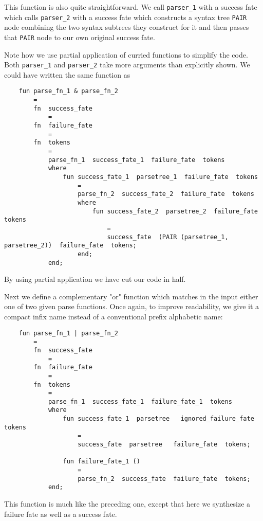 This function is also quite straightforward.  We call 
{\tt parser\_1} with a success fate 
which calls {\tt parser\_2} 
with a success fate which constructs a syntax tree 
{\tt PAIR} node combining the two syntax subtrees they 
construct for it and then passes that {\tt PAIR} 
node to our own original success fate.

Note how we use partial application of curried functions 
to simplify the code.  Both {\tt parser\_1} and {\tt parser\_2} 
take more arguments than explicitly shown.  We could have 
written the same function as

\begin{verbatim}
    fun parse_fn_1 & parse_fn_2
        =
        fn  success_fate
            =
        fn  failure_fate
            =
        fn  tokens
            =
            parse_fn_1  success_fate_1  failure_fate  tokens
            where
                fun success_fate_1  parsetree_1  failure_fate  tokens
                    =
                    parse_fn_2  success_fate_2  failure_fate  tokens
                    where
                        fun success_fate_2  parsetree_2  failure_fate  tokens
                            =
                            success_fate  (PAIR (parsetree_1, parsetree_2))  failure_fate  tokens;
                    end;
            end;
\end{verbatim}

By using partial application we have cut our code in half.

Next we define a complementary "or" function which matches in the 
input either one of two given parse functions.  Once again, to 
improve readability, we give it a compact infix name instead of 
a conventional prefix alphabetic name:

\begin{verbatim}
    fun parse_fn_1 | parse_fn_2
        =
        fn  success_fate
            =
        fn  failure_fate
            =
        fn  tokens
            =
            parse_fn_1  success_fate_1  failure_fate_1  tokens
            where
                fun success_fate_1  parsetree   ignored_failure_fate  tokens
                    =
                    success_fate  parsetree   failure_fate  tokens;

                fun failure_fate_1 ()
                    =
                    parse_fn_2  success_fate  failure_fate  tokens;
            end;
\end{verbatim}

This function is much like the preceding one, except that here 
we synthesize a failure fate as well as a success fate.

